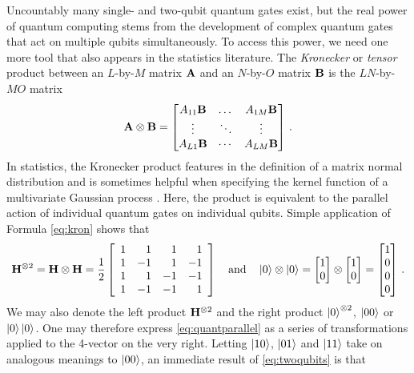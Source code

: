 \documentclass[12pt]{article} %
\begin{document}
Uncountably many single- and two-qubit quantum gates exist, but the real power of quantum computing stems from the development of complex quantum gates that act on multiple qubits simultaneously.   To access this power, we need one more tool that also appears in the statistics literature.  The \emph{Kronecker} or \emph{tensor} product between an $L$-by-$M$ matrix $\mathbf{A}$ and an $N$-by-$O$ matrix $\mathbf{B}$ is the $LN$-by-$MO$ matrix
\begin{align}\label{eq:kron}
	\mathbf{A} \otimes \mathbf{B} = \begin{bmatrix}
		A_{11} \mathbf{B} & \dots & A_{1M} \mathbf{B} \\
		\vdots & \ddots & \vdots \\
		A_{L1}\mathbf{B} & \cdots & A_{LM}  \mathbf{B}
	\end{bmatrix} \, .
\end{align} 
In statistics, the Kronecker product features in the definition of a matrix normal distribution and is sometimes helpful when specifying the kernel function of a multivariate Gaussian process \citep{werner2008estimation}. Here, the product is equivalent to the parallel action of individual quantum gates on individual qubits.  Simple application of Formula \eqref{eq:kron} shows that
\begin{align}\label{eq:twoqubits}
	\mathbf{H}^{\otimes 2} =\mathbf{H} \otimes \mathbf{H} = \frac{1}{2} \left[\begin{array}{rrrr}
		1 & 1 & 1 & 1 \\
		1 &  -1& 1 & -1 \\
		1 & 1 & -1 & -1 \\
		1 & -1 & -1 & 1
	\end{array}\right] \quad \mbox{and} \quad \ket{0}\otimes\ket{0}=\begin{bmatrix}
		1 \\ 0
	\end{bmatrix} \otimes \begin{bmatrix}
		1 \\ 0
	\end{bmatrix} = \begin{bmatrix}
		1 \\ 0 \\ 0 \\ 0
	\end{bmatrix} \, .
\end{align} 
We may also denote the left product $\mathbf{H}^{\otimes2}$ and the right product $\ket{0}^{\otimes2}$, $\ket{00}$ or $\ket{0}\ket{0}$. One may therefore express \eqref{eq:quantparallel} as a series of transformations applied to the 4-vector on the very right. Letting $\ket{10}$, $\ket{01}$ and $\ket{11}$ take on analogous meanings to $\ket{00}$, an immediate result of \eqref{eq:twoqubits} is that
\end{document}
